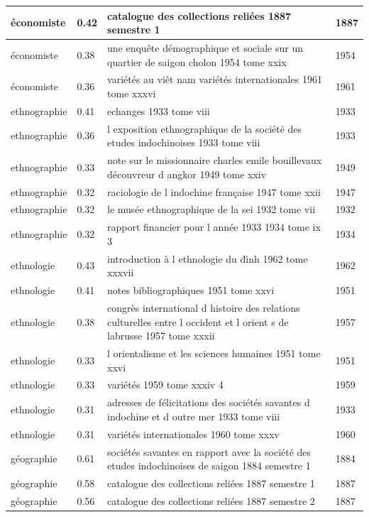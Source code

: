 \begin{longtable}{|p{3cm}|p{1cm}|p{10cm}|p{1cm}|}
économiste & 0.42 & catalogue des collections reliées 1887 semestre 1 & 1887  \\ \hline
économiste & 0.38 & une enquête démographique et sociale sur un quartier de saigon cholon 1954 tome xxix & 1954  \\ \hline
économiste & 0.36 & variétés au viêt nam variétés internationales 1961 tome xxxvi & 1961  \\ \hline
ethnographie & 0.41 & echanges 1933 tome viii & 1933  \\ \hline
ethnographie & 0.36 & l exposition ethnographique de la société des etudes indochinoises 1933 tome viii & 1933  \\ \hline
ethnographie & 0.33 & note sur le missionnaire charles emile bouillevaux découvreur d angkor 1949 tome xxiv & 1949  \\ \hline
ethnographie & 0.32 & raciologie de l indochine française 1947 tome xxii & 1947  \\ \hline
ethnographie & 0.32 & le musée ethnographique de la sei 1932 tome vii & 1932  \\ \hline
ethnographie & 0.32 & rapport financier pour l année 1933 1934 tome ix 3 & 1934  \\ \hline
ethnologie & 0.43 & introduction à l ethnologie du đình 1962 tome xxxvii & 1962  \\ \hline
ethnologie & 0.41 & notes bibliographiques 1951 tome xxvi & 1951  \\ \hline
ethnologie & 0.38 & congrès international d histoire des relations culturelles entre l occident et l orient s de labrusse 1957 tome xxxii & 1957  \\ \hline
ethnologie & 0.33 & l orientalisme et les sciences humaines 1951 tome xxvi & 1951  \\ \hline
ethnologie & 0.33 & variétés 1959 tome xxxiv 4 & 1959  \\ \hline
ethnologie & 0.31 & adresses de félicitations des sociétés savantes d indochine et d outre mer 1933 tome viii & 1933  \\ \hline
ethnologie & 0.31 & variétés internationales 1960 tome xxxv & 1960  \\ \hline
géographie & 0.61 & sociétés savantes en rapport avec la société des etudes indochinoises de saigon 1884 semestre 1 & 1884  \\ \hline
géographie & 0.58 & catalogue des collections reliées 1887 semestre 1 & 1887  \\ \hline
géographie & 0.56 & catalogue des collections reliées 1887 semestre 2 & 1887  \\ \hline

\end{longtable}
